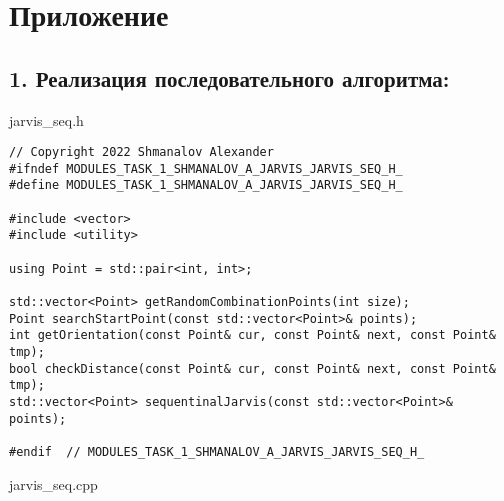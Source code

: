 \documentclass{report}
\begin{document}
\section*{Приложение}
\subsection*{1. Реализация последовательного алгоритма:}
\par jarvis\_seq.h
\begin{lstlisting}
// Copyright 2022 Shmanalov Alexander
#ifndef MODULES_TASK_1_SHMANALOV_A_JARVIS_JARVIS_SEQ_H_
#define MODULES_TASK_1_SHMANALOV_A_JARVIS_JARVIS_SEQ_H_

#include <vector>
#include <utility>

using Point = std::pair<int, int>;

std::vector<Point> getRandomCombinationPoints(int size);
Point searchStartPoint(const std::vector<Point>& points);
int getOrientation(const Point& cur, const Point& next, const Point& tmp);
bool checkDistance(const Point& cur, const Point& next, const Point& tmp);
std::vector<Point> sequentinalJarvis(const std::vector<Point>& points);

#endif  // MODULES_TASK_1_SHMANALOV_A_JARVIS_JARVIS_SEQ_H_
\end{lstlisting}
\par jarvis\_seq.cpp
\end{document}
